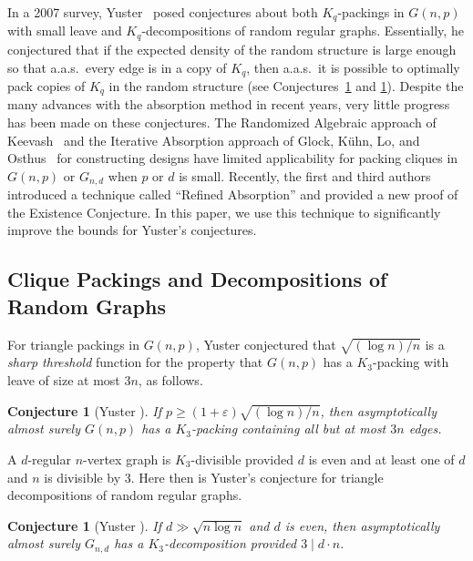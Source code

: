 \documentclass[11pt]{article}
\numberwithin{equation}{section}
\newcommand{\eps}{\varepsilon}
\newcounter{i}
\theoremstyle{plain}
\newtheorem{conj}[thm]{Conjecture}
\theoremstyle{plain} %
\theoremstyle{definition}
\newcommand{\aas}{a.a.s.\ }
\begin{document}
In a 2007 survey, Yuster~\cite{Yu07} posed conjectures about both $K_q$-packings in $G(n,p)$ with small leave and $K_q$-decompositions of random regular graphs.  Essentially, he conjectured that if the expected density of the random structure is large enough so that \aas every edge is in a copy of $K_q$, then \aas it is possible to optimally pack copies of $K_q$ in the random structure (see Conjectures~\ref{conj:YusterGnp} and \ref{conj:YusterGnd}).
Despite the many advances with the absorption method in recent years, very little progress has been made on these conjectures.  
The Randomized Algebraic approach of Keevash~\cite{K14} and the Iterative Absorption approach of Glock, K\"uhn, Lo, and Osthus~\cite{GKLO16} for constructing designs have limited applicability for packing cliques in $G(n,p)$ or $G_{n,d}$ when $p$ or $d$ is small.  
Recently, the first and third authors~\cite{DPI} introduced a technique called ``Refined Absorption'' and provided a new proof of the Existence Conjecture.  In this paper, we use this technique to significantly improve the bounds for Yuster's conjectures.


\subsection{Clique Packings and Decompositions of Random Graphs}

For triangle packings in $G(n,p)$, Yuster conjectured that $\sqrt{(\log n) / n}$ is a \textit{sharp threshold} function for the property that $G(n,p)$ has a $K_3$-packing with leave of size at most $3n$, as follows.

\begin{conj}[Yuster \cite{Yu07}]\label{conj:YusterGnp}
    If $p \geq (1 + \eps)\sqrt{(\log n) / n}$, then asymptotically almost surely $G(n, p)$ has a $K_3$-packing containing all but at most $3n$ edges.
\end{conj}

A $d$-regular $n$-vertex graph is $K_3$-divisible provided $d$ is even and at least one of $d$ and $n$ is divisible by 3. Here then is Yuster's conjecture for triangle decompositions of random regular graphs.

\begin{conj}[Yuster \cite{Yu07}]\label{conj:YusterGnd}
    If $d \gg \sqrt{n \log n}$ and $d$ is even, then asymptotically almost surely $G_{n,d}$ has a $K_3$-decomposition provided $3 \mid d \cdot n$.
\end{conj}
\end{document}
